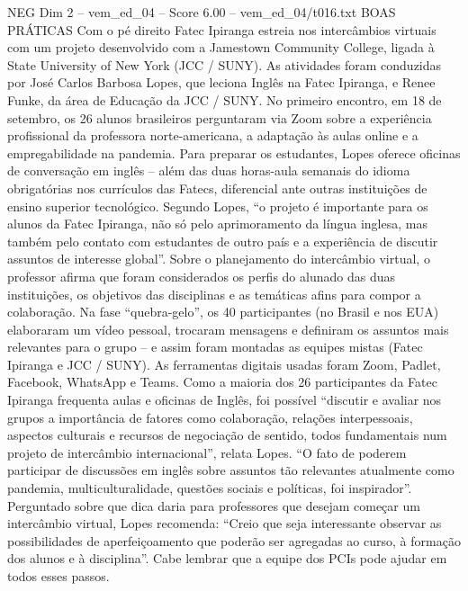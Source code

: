\begin{textsample}{NEG Dim 2 – vem\_ed\_04 – Score 6.00 – vem\_ed\_04/t016.txt}  \label{ex:f2_neg_133}
BOAS PRÁTICAS Com o pé direito Fatec Ipiranga estreia nos intercâmbios virtuais com um projeto desenvolvido com a Jamestown Community College, ligada à State University of New York (JCC / SUNY).
As atividades foram conduzidas por José Carlos Barbosa Lopes, que leciona Inglês na Fatec Ipiranga, e Renee Funke, da área de Educação da JCC / SUNY.
No primeiro encontro, em 18 de setembro, os 26 alunos brasileiros perguntaram via Zoom sobre a experiência profissional da professora norte-americana, a adaptação às aulas online e a empregabilidade na pandemia.
Para preparar os estudantes, Lopes oferece oficinas de conversação em inglês – além das duas horas-aula semanais do idioma obrigatórias nos currículos das Fatecs, diferencial ante outras instituições de ensino superior tecnológico.
Segundo Lopes, “o projeto é importante para os alunos da Fatec Ipiranga, não só pelo aprimoramento da língua inglesa, mas também pelo contato com estudantes de outro país e a experiência de discutir assuntos de interesse global”.
Sobre o planejamento do intercâmbio virtual, o professor afirma que foram considerados os perfis do alunado das duas instituições, os objetivos das disciplinas e as temáticas afins para compor a colaboração.
Na fase “quebra-gelo”, os 40 participantes (no Brasil e nos EUA) elaboraram um vídeo pessoal, trocaram mensagens e definiram os assuntos mais relevantes para o grupo – e assim foram montadas as equipes mistas (Fatec Ipiranga e JCC / SUNY).
As ferramentas digitais usadas foram Zoom, Padlet, Facebook, WhatsApp e Teams.
Como a maioria dos 26 participantes da Fatec Ipiranga frequenta aulas e oficinas de Inglês, foi possível “discutir e avaliar nos grupos a importância de fatores como colaboração, relações interpessoais, aspectos culturais e recursos de negociação de sentido, todos fundamentais num projeto de intercâmbio internacional”, relata Lopes. “O fato de poderem participar de discussões em inglês sobre assuntos tão relevantes atualmente como pandemia, multiculturalidade, questões sociais e políticas, foi inspirador”.
Perguntado sobre que dica daria para professores que desejam começar um intercâmbio virtual, Lopes recomenda: “Creio que seja interessante observar as possibilidades de aperfeiçoamento que poderão ser agregadas ao curso, à formação dos alunos e à disciplina”.
Cabe lembrar que a equipe dos PCIs pode ajudar em todos esses passos.

\end{textsample}
